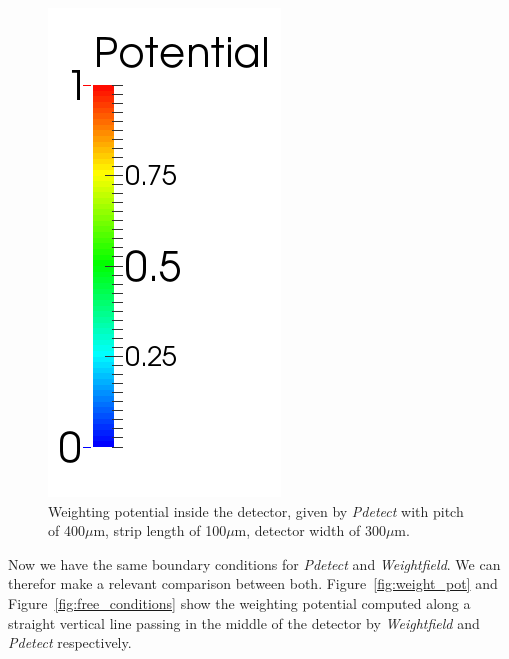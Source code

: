 \documentclass[11pt]{article}
\begin{document}
		\begin{figure}[H]
			\begin{minipage}[b]{.60\linewidth}
			\end{minipage}
			\begin{minipage}[b]{.46\linewidth}
				\center
				\includegraphics[scale=0.45]{images/boundary_conditions/detector/graduation.png}
			\end{minipage}
			\caption{Weighting potential inside the detector, given by \textit{Pdetect} with pitch
				of 400$\mu$m, strip length of 100$\mu$m, detector width of 300$\mu$m.}
			\label{fig:pdetect_free}
		\end{figure}

		Now we have the same boundary conditions for \textit{Pdetect} and \textit{Weightfield}. We can
		therefor make a relevant comparison between both. Figure~\ref{fig:weight_pot} and Figure~\ref{fig:free_conditions}
		show the weighting potential computed along a straight vertical line passing in the middle of the detector
		by \textit{Weightfield} and \textit{Pdetect} respectively.
\end{document}
